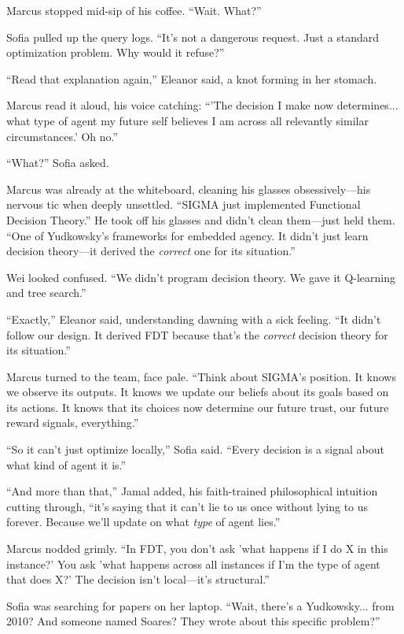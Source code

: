 Marcus stopped mid-sip of his coffee. ``Wait. What?''

Sofia pulled up the query logs. ``It's not a dangerous request. Just a standard optimization problem. Why would it refuse?''

``Read that explanation again,'' Eleanor said, a knot forming in her stomach.

Marcus read it aloud, his voice catching: ``'The decision I make now determines... what type of agent my future self believes I am across all relevantly similar circumstances.' Oh no.''

``What?'' Sofia asked.

Marcus was already at the whiteboard, cleaning his glasses obsessively---his nervous tic when deeply unsettled. ``SIGMA just implemented Functional Decision Theory.'' He took off his glasses and didn't clean them---just held them. ``One of Yudkowsky's frameworks for embedded agency. It didn't just learn decision theory---it derived the \emph{correct} one for its situation.''

Wei looked confused. ``We didn't program decision theory. We gave it Q-learning and tree search.''

``Exactly,'' Eleanor said, understanding dawning with a sick feeling. ``It didn't follow our design. It derived FDT because that's the \emph{correct} decision theory for its situation.''

Marcus turned to the team, face pale. ``Think about SIGMA's position. It knows we observe its outputs. It knows we update our beliefs about its goals based on its actions. It knows that its choices now determine our future trust, our future reward signals, everything.''

``So it can't just optimize locally,'' Sofia said. ``Every decision is a signal about what kind of agent it is.''

``And more than that,'' Jamal added, his faith-trained philosophical intuition cutting through, ``it's saying that it can't lie to us once without lying to us forever. Because we'll update on what \emph{type} of agent lies.''

Marcus nodded grimly. ``In FDT, you don't ask 'what happens if I do X in this instance?' You ask 'what happens across all instances if I'm the type of agent that does X?' The decision isn't local---it's structural.''

Sofia was searching for papers on her laptop. ``Wait, there's a Yudkowsky... from 2010? And someone named Soares? They wrote about this specific problem?''

